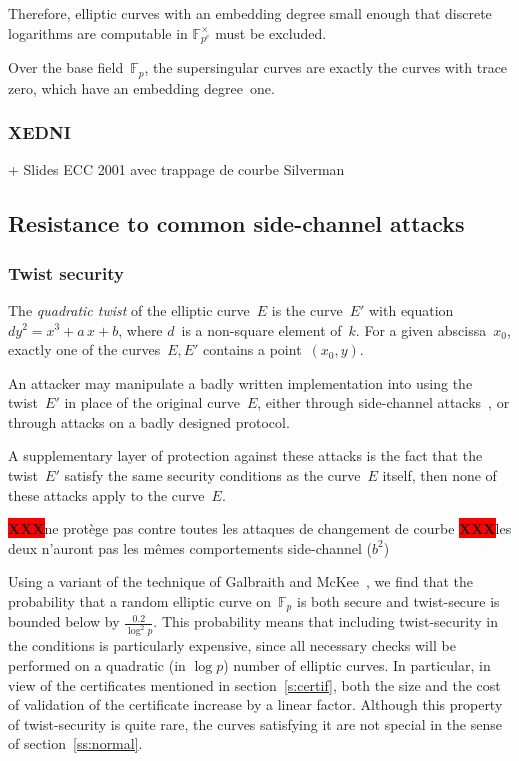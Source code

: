 \documentclass{article}
\def\F{\mathbb{F}}
\def\XXX{{\colorbox{red}{{\color{white}\bfseries XXX}}}}
\begin{document}
Therefore, elliptic curves with an embedding degree small enough
that discrete logarithms are computable in $\F_{p^e}^{×}$
must be excluded.

Over the base field~$\F_p$, the supersingular curves
are exactly the curves with trace zero,
which have an embedding degree~one.

\subsubsection{XEDNI}

+ Slides ECC 2001 avec trappage de courbe Silverman

\subsection{Resistance to common side-channel attacks}
\label{ss:side}

\subsubsection{Twist security}
\label{sss:twist}

The \emph{quadratic twist} of the elliptic curve~$E$
is the curve~$E'$ with equation~$d y^2 = x^3 + a\,x + b$,
where $d$~is a non-square element of~$k$.
For a given abscissa~$x_0$,
exactly one of the curves~$E, E'$ contains a point~$(x_0, y)$.

An attacker may manipulate a badly written implementation
into using the twist~$E'$
in place of the original curve~$E$,
either through side-channel attacks~\cite{fdtc2008flrv},
or through attacks on a badly designed protocol.

A supplementary layer of protection against these attacks
is the fact that the twist~$E'$ satisfy
the same security conditions as the curve~$E$ itself, then
none of these attacks apply to the curve~$E$.

\XXX ne protège pas contre toutes les attaques de changement de courbe
\XXX les deux n'auront pas les mêmes comportements side-channel ($b^2$)

Using a variant of the technique of Galbraith and McKee~\cite{lms2000gm},
we find that the probability that a random elliptic curve on~$\F_p$
is both secure and twist-secure
is bounded below by $\frac{0.2}{\log^2 p}$.
This probability means that
including twist-security in the conditions is particularly expensive,
since all necessary checks will be performed on
a quadratic (in $\log p$) number of elliptic curves.
In particular, in view of
the certificates mentioned in section~\ref{s:certif},
both the size and the cost of validation of the certificate
increase by a linear factor.
Although this property of twist-security is quite rare,
the curves satisfying it are not special
in the sense of section~\ref{ss:normal}.
\end{document}
